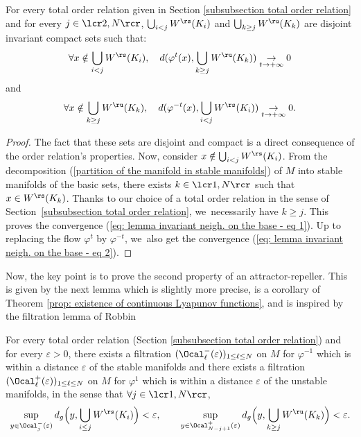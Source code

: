 \begin{lemma}\label{lemma: attractor and repeller for the flow on the basis}
For every total order relation given in Section \ref{subsubsection total order relation} and for every $j\in\lcr2,N\rcr$, $\bigcup_{i < j}W^\rs (K_i)$ and $\bigcup_{k \geq j}W^\ru (K_k)$ are disjoint invariant compact sets such that:
\begin{equation}\label{eq: lemma invariant neigh. on the base - eq 1}
\forall x \notin \bigcup_{i < j}W^\rs (K_i), \quad d (\varphi^t (x), \bigcup_{k \geq j}W^\ru (K_k)) \underset{t \to+\infty}{\to} 0
\end{equation}
and
\begin{equation}\label{eq: lemma invariant neigh. on the base - eq 2}
\forall x \notin \bigcup_{k \geq j}W^\ru (K_k), \quad d (\varphi^{-t} (x),\bigcup_{i < j}W^\rs (K_i)) \underset{t \to+\infty}{\to} 0.
\end{equation}
\end{lemma}

\begin{proof}
The fact that these sets are disjoint and compact is a direct consequence of the order relation's properties. Now, consider $x \notin \bigcup_{i < j}W^\rs (K_i)$. From the decomposition (\ref{partition of the manifold in stable manifolds}) of $M$ into stable manifolds of the basic sets, there exists $k\in\lcr1,N\rcr$ such that $x \in W^\rs(K_k)$. Thanks to our choice of a total order relation in the sense of Section~\ref{subsubsection total order relation}, we~necessarily have $k \geq j$. This proves the convergence (\ref{eq: lemma invariant neigh. on the base - eq 1}). Up to replacing the flow $\varphi^t$ by $\varphi^{-t}$, we~also get the convergence (\ref{eq: lemma invariant neigh. on the base - eq 2}).
\end{proof}

Now, the key point is to prove the second property of an attractor-repeller. This is given by the next lemma which is slightly more precise, is a corollary of Theorem \ref{prop: existence of continuous Lyapunov functions}, and is inspired by the filtration lemma of Robbin \cite[7.9]{robbin}

\begin{lemma}\label{lemma: equivalence filtration and unrevisited}
For every total order relation (Section \ref{subsubsection total order relation}) and for every $\varepsilon >0$, there exists a filtration $(\Ocal_{\ell}^- (\varepsilon))_{1\leq \ell \leq N}$ on $M$ for $\varphi^{-1}$ which is within a distance $\varepsilon$ of the stable manifolds and there exists a filtration $(\Ocal_{\ell}^+ (\varepsilon))_{1\leq \ell \leq N}$ on $M$ for $\varphi^{1}$ which is within a distance $\varepsilon$ of the unstable manifolds, in the sense that $\forall j \in \lcr1,N\rcr$,
\[
\sup_{y \in \Ocal_j^- (\varepsilon)} d_g \Bigl(y, \bigcup_{i \leq j} W^\rs (K_i) \Bigr) < \varepsilon, \qquad \sup_{y \in \Ocal_{N-j+1}^+ (\varepsilon)} d_g \Bigl(y, \bigcup_{k \geq j} W^\ru (K_k)\Bigr) < \varepsilon.
\]
\end{lemma}

